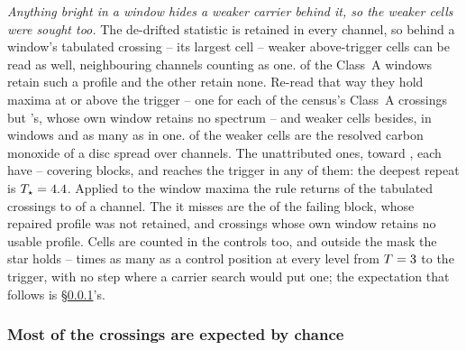 \emph{Anything bright in a window hides a weaker carrier behind it, so the
weaker cells were sought too.} The de-drifted statistic is retained in every
channel, so behind a window's tabulated crossing -- its largest cell --
weaker above-trigger cells can be read as well, neighbouring channels counting
as one. \CkNWin{} of the \NWinA{} Class~A windows retain such a profile and the
other \CkNWinNotCov{} retain none. Re-read that way they hold \CkNPrimary{}
maxima at or above the trigger -- one for each of the census's
\CkNCrossCenA{} Class~A crossings but \CkMissStar's, whose own window retains
no spectrum -- and \CkNSecondaryWord{} weaker cells besides, in \CkNSecWin{}
windows and as many as \CkNSecMax{} in one. \CkNSecAttr{} of the weaker cells
are the resolved carbon monoxide of a disc spread over channels. The
\CkNSecUnattrWord{} unattributed ones, toward \CkSecStars, each have
\CkCovLo--\CkCovHi{} covering blocks, and \CkNRecurWord{} reaches the trigger
in any of them: the deepest repeat is $T_\star=4.4$. Applied to the window maxima the rule returns \CkRegN{} of the
\EvNCrossRaw{} tabulated crossings to \CkRegDev{} of a channel. The
\CkRegMiss{} it misses are the \EvNCrossFlag{} of the failing block, whose
repaired profile was not retained, and crossings whose own window retains no
usable profile.
Cells are counted in the controls too, and outside the mask the star holds
\CkRatioLo--\CkRatioHi{} times as many as a control position at every level
from $T=3$ to the trigger, with no step where a carrier search would
put one; the expectation that follows is \S\ref{sec:trigunif}'s.

\subsubsection{Most of the crossings are expected by chance}
\label{sec:trigunif}

